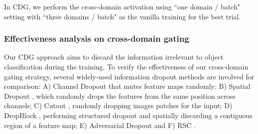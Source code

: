 In CDG, we perform the cross-domain activation using ``one domain / batch" setting with ``three domains / batch" as the vanilla training for the best trial.

\subsubsection{Effectiveness analysis on cross-domain gating}
Our CDG approach aims to discard the information irrelevant to object classification during the training. To verify the effectiveness of our cross-domain gating strategy, several widely-used information dropout methods are involved for comparison: A) Channel Dropout that mutes feature maps randomly; B) Spatial Dropout \citep{tompson2015efficient}, which randomly drops the features from the same position across channels; C) Cutout \citep{devries2017improved}, randomly dropping images patches for the input; D) DropBlock \citep{ghiasi2018dropblock}, performing structured dropout and spatially discarding a contiguous region of a feature map; E) Adversarial Dropout \citep{ParkPSM18} and F) RSC \citep{huangRSC2020}.

